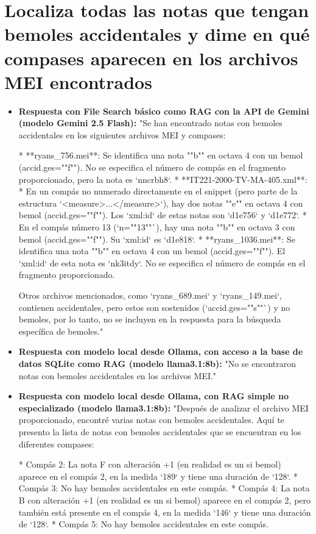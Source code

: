 \section{Localiza todas las notas que tengan bemoles accidentales y dime en qué compases aparecen en los archivos MEI encontrados}
\begin{itemize}
    \item \textbf{Respuesta con File Search básico como RAG con la API de Gemini (modelo Gemini 2.5 Flash):} "Se han encontrado notas con bemoles accidentales en los siguientes archivos MEI y compases:

*   **ryans\_756.mei**: Se identifica una nota ""b"" en octava 4 con un bemol (accid.ges=""f""). No se especifica el número de compás en el fragmento proporcionado, pero la nota es `nncrbh8`.
*   **IT221-2000-TV-MA-405.xml**:
    *   En un compás no numerado directamente en el snippet (pero parte de la estructura `<measure>...</measure>`), hay dos notas ""e"" en octava 4 con bemol (accid.ges=""f""). Los `xml:id` de estas notas son `d1e756` y `d1e772`.
    *   En el compás número 13 (`n=""13""`), hay una nota ""b"" en octava 3 con bemol (accid.ges=""f""). Su `xml:id` es `d1e818`.
*   **ryans\_1036.mei**: Se identifica una nota ""b"" en octava 4 con un bemol (accid.ges=""f""). El `xml:id` de esta nota es `nk3itdy`. No se especifica el número de compás en el fragmento proporcionado.

Otros archivos mencionados, como `ryans\_689.mei` y `ryans\_149.mei`, contienen accidentales, pero estos son sostenidos (`accid.ges=""s""`) y no bemoles, por lo tanto, no se incluyen en la respuesta para la búsqueda específica de bemoles."
    \item \textbf{Respuesta con modelo local desde Ollama, con acceso a la base de datos SQLite como RAG (modelo llama3.1:8b):} "No se encontraron notas con bemoles accidentales en los archivos MEI."
    \item \textbf{Respuesta con modelo local desde Ollama, con RAG simple no especializado (modelo llama3.1:8b):} "Después de analizar el archivo MEI proporcionado, encontré varias notas con bemoles accidentales. Aquí te presento la lista de notas con bemoles accidentales que se encuentran en los diferentes compases:

* Compás 2: La nota F con alteración +1 (en realidad es un si bemol) aparece en el compás 2, en la medida `189` y tiene una duración de `128`.
* Compás 3: No hay bemoles accidentales en este compás.
* Compás 4: La nota B con alteración +1 (en realidad es un si bemol) aparece en el compás 2, pero también está presente en el compás 4, en la medida `146` y tiene una duración de `128`.
* Compás 5: No hay bemoles accidentales en este compás.


\end{itemize}
